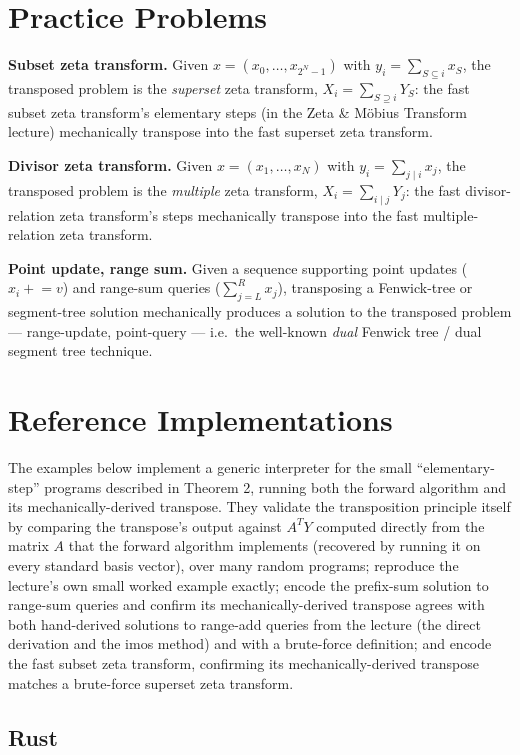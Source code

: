 \documentclass[11pt]{article}
\begin{document}
\section{Practice Problems}
\begin{examplebox}
\textbf{Subset zeta transform.} Given $x=(x_0,\ldots,x_{2^N-1})$ with
$y_i=\sum_{S\subseteq i}x_S$, the transposed problem is the
\emph{superset} zeta transform, $X_i=\sum_{S\supseteq i}Y_S$: the fast
subset zeta transform's elementary steps (in the Zeta \& M\"obius
Transform lecture) mechanically transpose into the fast superset zeta
transform.

\textbf{Divisor zeta transform.} Given $x=(x_1,\ldots,x_N)$ with
$y_i=\sum_{j\mid i}x_j$, the transposed problem is the \emph{multiple}
zeta transform, $X_i=\sum_{i\mid j}Y_j$: the fast divisor-relation zeta
transform's steps mechanically transpose into the fast
multiple-relation zeta transform.

\textbf{Point update, range sum.} Given a sequence supporting point
updates ($x_i\mathrel{+}=v$) and range-sum queries
($\sum_{j=L}^{R}x_j$), transposing a Fenwick-tree or segment-tree
solution mechanically produces a solution to the transposed problem ---
range-update, point-query --- i.e.\ the well-known \emph{dual}
Fenwick tree / dual segment tree technique.
\end{examplebox}

\section{Reference Implementations}
The examples below implement a generic interpreter for the small
``elementary-step'' programs described in Theorem 2, running both the
forward algorithm and its mechanically-derived transpose. They validate
the transposition principle itself by comparing the transpose's output
against $A^TY$ computed directly from the matrix $A$ that the forward
algorithm implements (recovered by running it on every standard basis
vector), over many random programs; reproduce the lecture's own small
worked example exactly; encode the prefix-sum solution to range-sum
queries and confirm its mechanically-derived transpose agrees with both
hand-derived solutions to range-add queries from the lecture (the
direct derivation and the imos method) and with a brute-force
definition; and encode the fast subset zeta transform, confirming its
mechanically-derived transpose matches a brute-force superset zeta
transform.

\codenote
\subsection{Rust}
\end{document}
